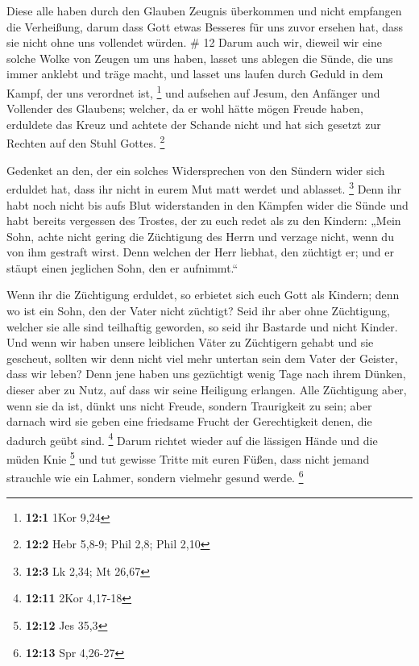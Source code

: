  Diese alle haben durch den Glauben Zeugnis überkommen
und nicht empfangen die Verheißung,  darum dass Gott
etwas Besseres für uns zuvor ersehen hat, dass sie nicht ohne uns
vollendet würden. \# 12  Darum auch wir, dieweil wir eine
solche Wolke von Zeugen um uns haben, lasset uns ablegen die Sünde, die
uns immer anklebt und träge macht, und lasset uns laufen durch Geduld in
dem Kampf, der uns verordnet ist, \footnote{\textbf{12:1} 1Kor 9,24}
 und aufsehen auf Jesum, den Anfänger und Vollender des
Glaubens; welcher, da er wohl hätte mögen Freude haben, erduldete das
Kreuz und achtete der Schande nicht und hat sich gesetzt zur Rechten auf
den Stuhl Gottes. \footnote{\textbf{12:2} Hebr 5,8-9; Phil 2,8; Phil
  2,10}

 Gedenket an den, der ein solches Widersprechen von den
Sündern wider sich erduldet hat, dass ihr nicht in eurem Mut matt werdet
und ablasset. \footnote{\textbf{12:3} Lk 2,34; Mt 26,67} 
Denn ihr habt noch nicht bis aufs Blut widerstanden in den Kämpfen wider
die Sünde  und habt bereits vergessen des Trostes, der zu
euch redet als zu den Kindern: „Mein Sohn, achte nicht gering die
Züchtigung des Herrn und verzage nicht, wenn du von ihm gestraft wirst.
 Denn welchen der Herr liebhat, den züchtigt er; und er
stäupt einen jeglichen Sohn, den er aufnimmt.``

 Wenn ihr die Züchtigung erduldet, so erbietet sich euch
Gott als Kindern; denn wo ist ein Sohn, den der Vater nicht züchtigt?
 Seid ihr aber ohne Züchtigung, welcher sie alle sind
teilhaftig geworden, so seid ihr Bastarde und nicht Kinder.
 Und wenn wir haben unsere leiblichen Väter zu Züchtigern
gehabt und sie gescheut, sollten wir denn nicht viel mehr untertan sein
dem Vater der Geister, dass wir leben?  Denn jene haben
uns gezüchtigt wenig Tage nach ihrem Dünken, dieser aber zu Nutz, auf
dass wir seine Heiligung erlangen.  Alle Züchtigung aber,
wenn sie da ist, dünkt uns nicht Freude, sondern Traurigkeit zu sein;
aber darnach wird sie geben eine friedsame Frucht der Gerechtigkeit
denen, die dadurch geübt sind. \footnote{\textbf{12:11} 2Kor 4,17-18}
 Darum richtet wieder auf die lässigen Hände und die
müden Knie \footnote{\textbf{12:12} Jes 35,3}  und tut
gewisse Tritte mit euren Füßen, dass nicht jemand strauchle wie ein
Lahmer, sondern vielmehr gesund werde. \footnote{\textbf{12:13} Spr
  4,26-27}

